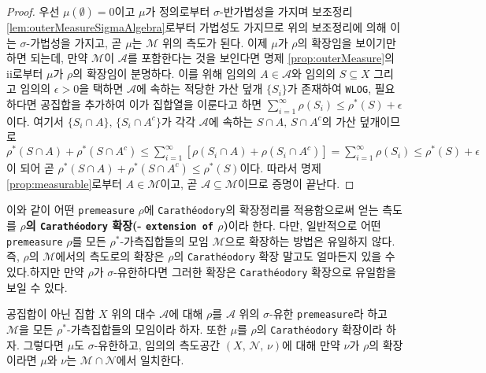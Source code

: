 \begin{proof}
    우선 $\mu(\emptyset)=0$이고 $\mu$가 정의로부터 $\sigma$-반가법성을 가지며 보조정리 \ref{lem:outerMeasureSigmaAlgebra}로부터 가법성도 가지므로 위의 보조정리에 의해 이는 $\sigma$-가법성을 가지고, 곧 $\mu$는 $\mathcal{M}$ 위의 측도가 된다. 이제 $\mu$가 $\rho$의 확장임을 보이기만 하면 되는데, 만약 $\mathcal{M}$이 $\mathcal{A}$를 포함한다는 것을 보인다면 명제 \ref{prop:outerMeasure}의 ii로부터 $\mu$가 $\rho$의 확장임이 분명하다. 이를 위해 임의의 $A\in\mathcal{A}$와 임의의 $S\subseteq X$ 그리고 임의의 $\epsilon>0$을 택하면 $\mathcal{A}$에 속하는 적당한 가산 덮개 $\{S_i\}$가 존재하여 \texttt{WLOG}, 필요하다면 공집합을 추가하여 이가 집합열을 이룬다고 하면 $\sum_{i=1}^\infty\rho(S_i)\leq\rho^*(S)+\epsilon$이다. 여기서 $\{S_i\cap A\},\,\{S_i\cap A^c\}$가 각각 $\mathcal{A}$에 속하는 $S\cap A,\,S\cap A^c$의 가산 덮개이므로 $\rho^*(S\cap A)+\rho^*(S\cap A^c)\leq\sum_{i=1}^\infty[\rho(S_i\cap A)+\rho(S_i\cap A^c)]=\sum_{i=1}^\infty\rho(S_i)\leq\rho^*(S)+\epsilon$이 되어 곧 $\rho^*(S\cap A)+\rho^*(S\cap A^c)\leq\rho^*(S)$이다. 따라서 명제 \ref{prop:measurable}로부터 $A\in\mathcal{M}$이고, 곧 $\mathcal{A}\subseteq\mathcal{M}$이므로 증명이 끝난다.
\end{proof}

이와 같이 어떤 \texttt{premeasure} $\rho$에 \texttt{Carath\'eodory}의 확장정리를 적용함으로써 얻는 측도를 \textbf{$\rho$의 \texttt{Carath\'eodory} 확장(- \texttt{extension of} $\rho$)}이라 한다. 다만, 일반적으로 어떤 \texttt{premeasure} $\rho$를 모든 $\rho^*$-가측집합들의 모임 $\mathcal{M}$으로 확장하는 방법은 유일하지 않다. 즉, $\rho$의 $\mathcal{M}$에서의 측도로의 확장은 $\rho$의 \texttt{Carath\'eodory} 확장 말고도 얼마든지 있을 수 있다.\footnotemark 하지만 만약 $\rho$가 $\sigma$-유한하다면 그러한 확장은 \texttt{Carath\'eodory} 확장으로 유일함을 보일 수 있다.

\begin{theorem}\label{thm:CaratheodoryUnique}
    공집합이 아닌 집합 $X$ 위의 대수 $\mathcal{A}$에 대해 $\rho$를 $\mathcal{A}$ 위의 $\sigma$-유한 \texttt{premeasure}라 하고 $\mathcal{M}$을 모든 $\rho^*$-가측집합들의 모임이라 하자. 또한 $\mu$를 $\rho$의 \texttt{Carath\'eodory} 확장이라 하자. 그렇다면 $\mu$도 $\sigma$-유한하고, 임의의 측도공간 $(X,\,\mathcal{N},\,\nu)$에 대해 만약 $\nu$가 $\rho$의 확장이라면 $\mu$와 $\nu$는 $\mathcal{M}\cap\mathcal{N}$에서 일치한다.
\end{theorem}

